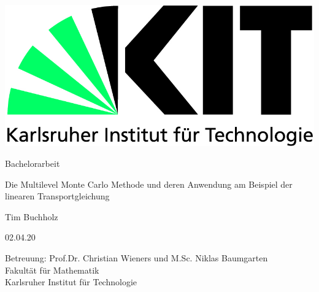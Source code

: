 \documentclass[12pt,a4paper]{scrartcl}
\theoremstyle{definition}
\numberwithin{equation}{section}
\begin{document}
  \pagestyle{empty}
  
  
  \begin{titlepage}

    \includegraphics[scale=0.45]{kit-logo.jpg} 
    \vspace*{2cm} 

 \begin{center} \large 
    
    Bachelorarbeit
    \vspace*{2cm}

    {\huge Die Multilevel Monte Carlo Methode und deren Anwendung am Beispiel der linearen Transportgleichung}
    \vspace*{2.5cm}

    Tim Buchholz
    \vspace*{1.5cm}

    02.04.20
    \vspace*{4.5cm}


    Betreuung: Prof.Dr. Christian Wieners und M.Sc. Niklas Baumgarten \\[1cm]
    Fakultät für Mathematik \\[1cm]
		Karlsruher Institut für Technologie
  \end{center}
\end{titlepage}



  \tableofcontents

\newpage
 


  \pagestyle{headings}



%

 \newpage  %
 
\end{document}
